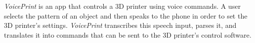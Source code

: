 \textit{VoicePrint} is an app that controls a 3D printer using voice commands. A user selects the pattern of an object and then speaks to the phone in order to set the 3D printer's settings. \textit{VoicePrint} transcribes this speech input, parses it, and translates it into commands that can be sent to the 3D printer's control software.
